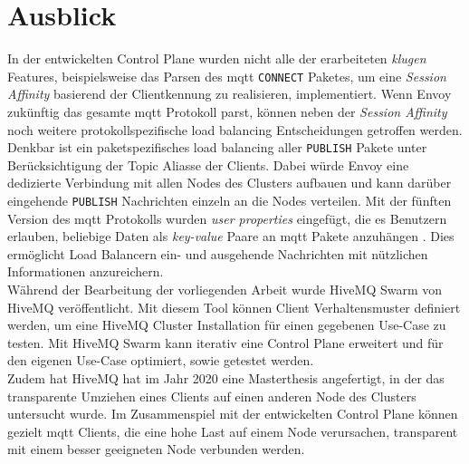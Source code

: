 \section{Ausblick}
In der entwickelten Control Plane wurden nicht alle der erarbeiteten \textit{klugen} Features, beispielsweise das Parsen des \ac{mqtt} \verb|CONNECT| Paketes, um eine \textit{Session Affinity} basierend der Clientkennung zu realisieren, implementiert.
Wenn Envoy zukünftig das gesamte \ac{mqtt} Protokoll parst, können neben der \textit{Session Affinity} noch weitere protokollspezifische load balancing Entscheidungen getroffen werden.
Denkbar ist ein paketspezifisches load balancing aller \verb|PUBLISH| Pakete unter Berücksichtigung der Topic Aliasse der Clients. Dabei würde Envoy eine dedizierte Verbindung mit allen Nodes des Clusters aufbauen und kann darüber eingehende \verb|PUBLISH| Nachrichten einzeln an die Nodes verteilen.
Mit der fünften Version des \ac{mqtt} Protokolls wurden \textit{user properties} eingefügt, die es Benutzern erlauben, beliebige Daten als \textit{key-value} Paare an \ac{mqtt} Pakete anzuhängen \cite{raschbichlerMQTTHowNewa}.
Dies ermöglicht Load Balancern ein- und ausgehende Nachrichten mit nützlichen Informationen anzureichern.
\\
Während der Bearbeitung der vorliegenden Arbeit wurde HiveMQ Swarm \cite{teamHiveMQSwarmFind} von HiveMQ veröffentlicht. Mit diesem Tool können Client Verhaltensmuster definiert werden, um eine HiveMQ Cluster Installation für einen gegebenen Use-Case zu testen.
Mit HiveMQ Swarm kann iterativ eine Control Plane erweitert und für den eigenen Use-Case optimiert, sowie getestet werden.
\\
Zudem hat HiveMQ hat im Jahr 2020 eine Masterthesis angefertigt, in der das transparente Umziehen eines Clients auf einen anderen Node des Clusters untersucht wurde. Im Zusammenspiel mit der entwickelten Control Plane können gezielt \ac{mqtt} Clients, die eine hohe Last auf einem Node verursachen, transparent mit einem besser geeigneten Node verbunden werden.
\newpage

